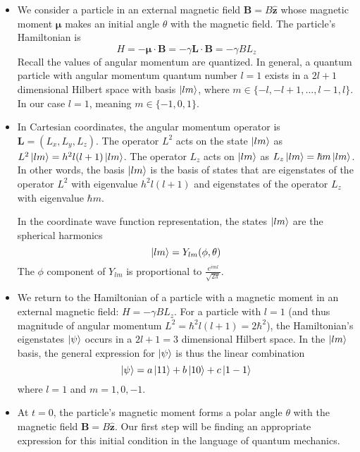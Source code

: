 \documentclass[11pt, a4paper]{article}
\renewcommand{\vec}[1]{\bm{#1}} %
\newcommand{\uvec}[1]{\hat{\vec{#1}}} %
\newcommand{\m}{\vec{\mu}}  %
\begin{document}
\begin{itemize}
	\item We consider a particle in an external magnetic field $ \vec{B} = B\uvec{z} $ whose magnetic moment $ \vec{\mu} $ makes an initial angle $ \theta $ with the magnetic field. The particle's Hamiltonian is
	\begin{equation*}
		H = - \m \cdot \vec{B} = - \gamma \vec{L} \cdot \vec{B} = - \gamma B L_{z}
	\end{equation*}
	Recall the values of angular momentum are quantized. In general, a quantum particle with angular momentum quantum number $ l = 1 $ exists in a $ 2l + 1 $ dimensional Hilbert space with basis $ \ket{lm} $, where $ m \in \{-l, -l+1, \ldots, l-1, l\}  $. In our case $ l = 1 $, meaning $ m \in \{-1, 0, 1\} $.
	
	\item In Cartesian coordinates, the angular momentum operator is $ \vec{L} = (L_{x}, L_{y}, L_{z}) $. The operator $ L^{2} $ acts on the state $ \ket{lm} $ as $ L^{2}\ket{lm} = h^{2}l(l+1) \ket{lm}$. The operator $ L_{z} $ acts on $ \ket{lm} $ as $ L_{z} \ket{lm} = \hbar m \ket{lm} $. In other words, the basis $ \ket{lm} $ is the basis of states that are eigenstates of the operator $ L^{2} $ with eigenvalue $ h^{2}l(l+1) $ and eigenstates of the operator $ L_{z} $ with eigenvalue $ \hbar m $. 
	
	In the coordinate wave function representation, the states $ \ket{lm} $ are the spherical harmonics
	\begin{equation*}
		\ket{lm} = Y_{lm}(\phi, \theta)
	\end{equation*}
	The $ \phi $ component of $ Y_{lm} $ is proportional to $ \frac{e^{iml}}{\sqrt{2\pi}} $. 
	
	\item We return to the Hamiltonian of a particle with a magnetic moment in an external magnetic field: $ H = -\gamma BL_{z} $. For a particle with $ l = 1 $ (and thus magnitude of angular momentum $ L^{2} = \hbar^{2}l (l+1) = 2\hbar^{2} $), the Hamiltonian's eigenstates $ \ket{\psi} $ occurs in a $ 2l + 1 = 3 $ dimensional Hilbert space. In the $ \ket{lm} $ basis, the general expression for $ \ket{\psi} $ is thus the linear combination
	\begin{equation*}
		\ket{\psi} = a \ket{11} + b \ket{10} + c \ket{1 -1}
	\end{equation*}
	where $ l = 1 $ and $ m = 1, 0, -1 $. 
	
	\item At $ t = 0 $, the particle's magnetic moment forms a polar angle $ \theta $ with the magnetic field $ \vec{B} = B \uvec{z} $. Our first step will be finding an appropriate expression for this initial condition in the language of quantum mechanics.
\end{itemize}
\end{document}
